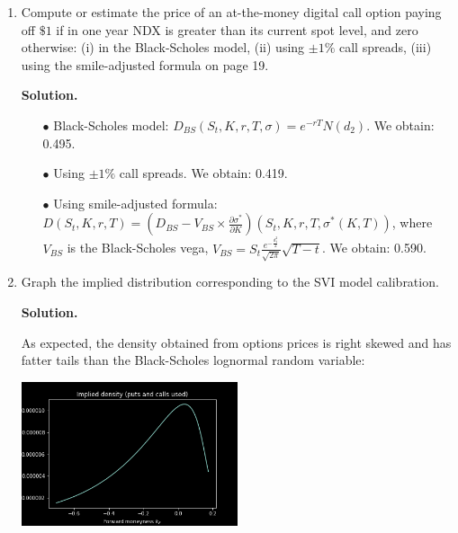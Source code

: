\documentclass[12pt]{article}
\newenvironment{solution}{\vspace{0.2cm} \textbf{Solution.}}{}
\begin{document}
\begin{enumerate}[label=(\alph*)]
\begin{solution}
		\end{solution}

		\item Compute or estimate the price of an at-the-money digital call option paying off $\$1$ if in one year NDX is greater than its current spot level, and zero otherwise: (i) in the Black-Scholes model, (ii) using $\pm 1\%$ call spreads, (iii) using the smile-adjusted formula on page 19.

		\begin{solution}

		\begin{enumerate}
			\item[$\bullet$] Black-Scholes model: $D_{BS}(S_t,K,r,T,\sigma)=e^{-rT}N(d_2)$. We obtain: 0.495.
			\item[$\bullet$] Using $\pm 1\%$ call spreads. We obtain: 0.419.
			\item[$\bullet$] Using smile-adjusted formula: $D(S_t,K,r,T) = (D_{BS}- V_{BS} \times \frac{\partial \sigma^*}{\partial K})(S_t,K,r,T,\sigma^*(K,T))$, where $V_{BS}$ is the Black-Scholes vega, $V_{BS} = S_t \frac{e^{-\frac{d_1^2}{2}}}{\sqrt{2\pi}} \sqrt{T-t}$. We obtain: 0.590.
		\end{enumerate}

		\end{solution}

		\item Graph the implied distribution corresponding to the SVI model calibration.

		\begin{solution}

			As expected, the density obtained from options prices is right skewed and has fatter tails than the Black-Scholes lognormal random variable:
			
			\begin{center}
				\includegraphics[width=0.5\textwidth]{implied_distribution}
			\end{center}

		\end{solution}


\end{enumerate}
\end{document}
